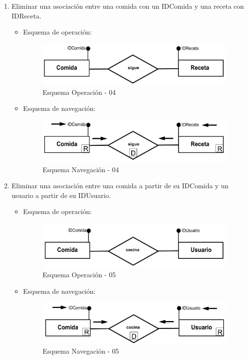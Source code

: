 \documentclass[a4paper,12pt]{report}
\begin{document}
\begin{enumerate}
\item Eliminar una asociación entre una comida con un IDComida y una receta con IDReceta.
\begin{itemize}
\item Esquema de operación:
\begin{figure}[!htp]
\centering
\includegraphics[width=0.9\linewidth]{./operaciones/img/Comidas/04_ope.png}
\caption{Esquema Operación - 04}
\label{fig:ope04}
\medskip
\footnotesize
{}
\end{figure}
\item Esquema de navegación:
\begin{figure}[!htp]
\centering
\includegraphics[width=0.9\linewidth]{./operaciones/img/Comidas/04_nav.png}
\caption{Esquema Navegación - 04}
\label{fig:nave04}
\medskip
\footnotesize
{}
\end{figure}
\end{itemize}

\item Eliminar una asociación entre una comida a partir de su IDComida y un usuario a partir de su IDUsuario.
\begin{itemize}
\item Esquema de operación:
\begin{figure}[!htp]
\centering
\includegraphics[width=0.9\linewidth]{./operaciones/img/Comidas/05_ope.png}
\caption{Esquema Operación - 05}
\label{fig:ope05}
\medskip
\footnotesize
{}
\end{figure}
\item Esquema de navegación:
\begin{figure}[!htp]
\centering
\includegraphics[width=0.9\linewidth]{./operaciones/img/Comidas/05_nav.png}
\caption{Esquema Navegación - 05}
\label{fig:nave05}
\medskip
\footnotesize
{}
\end{figure}
\end{itemize}


\end{enumerate}
\end{document}

